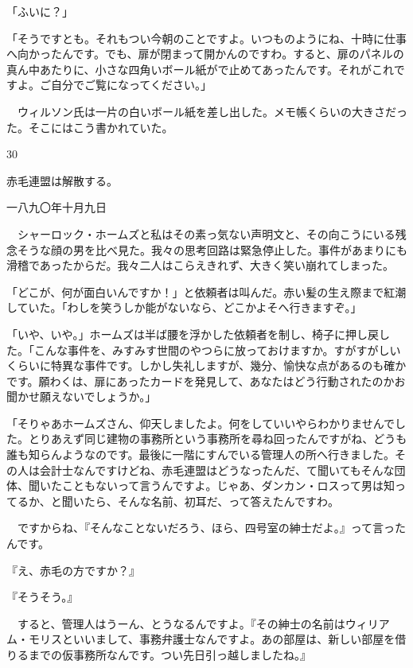 \documentclass[tate,paper=b6j,jafontsize=9pt]{jlreq}
\begin{document}
「ふいに？」

「そうですとも。それもつい今朝のことですよ。いつものようにね、十時に仕事へ向かったんです。でも、扉が閉まって開かんのですわ。すると、扉のパネルの真ん中あたりに、小さな四角いボール紙がで止めてあったんです。それがこれですよ。ご自分でご覧になってください。」

　ウィルソン氏は一片の白いボール紙を差し出した。メモ帳くらいの大きさだった。そこにはこう書かれていた。


\begin{azconvIndented}{3\zw}{0\zw}

赤毛連盟は解散する。

一八九〇年十月九日

\end{azconvIndented}


　シャーロック・ホームズと私はその素っ気ない声明文と、その向こうにいる残念そうな顔の男を比べ見た。我々の思考回路は緊急停止した。事件があまりにも滑稽であったからだ。我々二人はこらえきれず、大きく笑い崩れてしまった。

「どこが、何が面白いんですか！」と依頼者は叫んだ。赤い髪の生え際まで紅潮していた。「わしを笑うしか能がないなら、どこかよそへ行きますぞ。」

「いや、いや。」ホームズは半ば腰を浮かした依頼者を制し、椅子に押し戻した。「こんな事件を、みすみす世間のやつらに放っておけますか。すがすがしいくらいに特異な事件です。しかし失礼しますが、幾分、愉快な点があるのも確かです。願わくは、扉にあったカードを発見して、あなたはどう行動されたのかお聞かせ願えないでしょうか。」

「そりゃあホームズさん、仰天しましたよ。何をしていいやらわかりませんでした。とりあえず同じ建物の事務所という事務所を尋ね回ったんですがね、どうも誰も知らんようなのです。最後に一階にすんでいる管理人の所へ行きました。その人は会計士なんですけどね、赤毛連盟はどうなったんだ、て聞いてもそんな団体、聞いたこともないって言うんですよ。じゃあ、ダンカン・ロスって男は知ってるか、と聞いたら、そんな名前、初耳だ、って答えたんですわ。

　ですからね、『そんなことないだろう、ほら、四号室の紳士だよ。』って言ったんです。

『え、赤毛の方ですか？』

『そうそう。』

　すると、管理人はうーん、とうなるんですよ。『その紳士の名前はウィリアム・モリスといいまして、事務弁護士なんですよ。あの部屋は、新しい部屋を借りるまでの仮事務所なんです。つい先日引っ越しましたね。』
\end{document}
